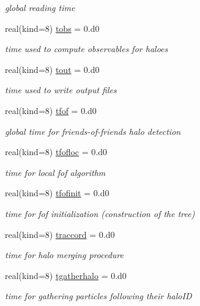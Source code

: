 \begin{DoxyCompactItemize}
\begin{DoxyCompactList}\small\item\em global reading time \end{DoxyCompactList}\item 
real(kind=8) \hyperlink{classmodtiming_a83f5f02456356934410977b127c6308c}{tobs} = 0.d0
\begin{DoxyCompactList}\small\item\em time used to compute observables for haloes \end{DoxyCompactList}\item 
real(kind=8) \hyperlink{classmodtiming_aad2ce715be55a32442a507f77e24f096}{tout} = 0.d0
\begin{DoxyCompactList}\small\item\em time used to write output files \end{DoxyCompactList}\item 
real(kind=8) \hyperlink{classmodtiming_ac6dbf200ea4d6d6248bb9df21ed8d2a7}{tfof} = 0.d0
\begin{DoxyCompactList}\small\item\em global time for friends-\/of-\/friends halo detection \end{DoxyCompactList}\item 
real(kind=8) \hyperlink{classmodtiming_a2574a405aaa97058f43e1e6b0b1d96e1}{tfofloc} = 0.d0
\begin{DoxyCompactList}\small\item\em time for local fof algorithm \end{DoxyCompactList}\item 
real(kind=8) \hyperlink{classmodtiming_a2c5b98c383953b670ee94c1022c2d822}{tfofinit} = 0.d0
\begin{DoxyCompactList}\small\item\em time for fof initialization (construction of the tree) \end{DoxyCompactList}\item 
real(kind=8) \hyperlink{classmodtiming_a9b8eac461e18e3b6c057420bae5b004e}{traccord} = 0.d0
\begin{DoxyCompactList}\small\item\em time for halo merging procedure \end{DoxyCompactList}\item 
real(kind=8) \hyperlink{classmodtiming_a6a20740b33d07d1c6b9ed51953b48b0d}{tgatherhalo} = 0.d0
\begin{DoxyCompactList}\small\item\em time for gathering particles following their halo\-I\-D \end{DoxyCompactList}\item 

\end{DoxyCompactItemize}
